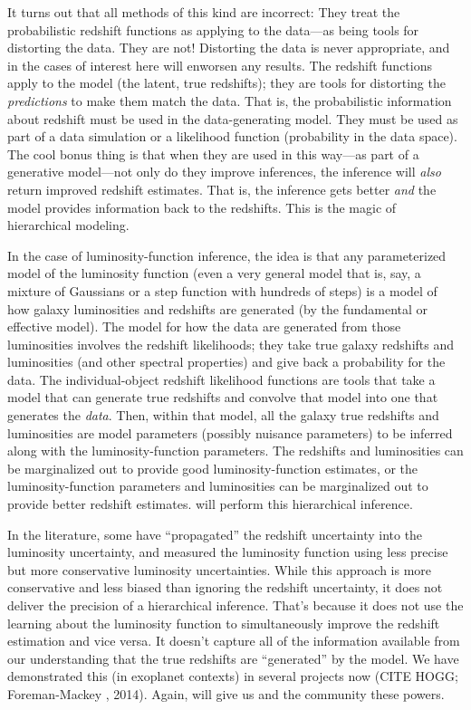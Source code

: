\documentclass[12pt]{article}
\begin{document}
It turns out that all methods of this kind are incorrect:
They treat the probabilistic redshift functions as applying to the
data---as being tools for distorting the data.
They are not!
Distorting the data is never appropriate, and in the cases of interest
here will enworsen any results.
The redshift functions apply to the model (the latent, true redshifts); they are tools
for distorting the \emph{predictions} to make them match the data.
That is, the probabilistic information about redshift must be used in
the data-generating model.
They must be used as part of a data simulation or a likelihood
function (probability in the data space).
The cool bonus thing is that when they are used in this way---as part
of a generative model---not only do they improve inferences, the
inference will \emph{also} return improved redshift estimates.  That
is, the inference gets better \emph{and} the model provides
information back to the redshifts.
This is the magic of hierarchical modeling.

In the case of luminosity-function inference,
the idea is that any parameterized model of the luminosity function
(even a very general model that is, say, a mixture of Gaussians or a
step function with hundreds of steps) is a model of how galaxy
luminosities and redshifts are generated (by the fundamental or
effective model).
The model for how the data are generated from those luminosities
involves the redshift likelihoods; they take true galaxy redshifts and
luminosities (and other spectral properties) and give back a
probability for the data.
The individual-object redshift likelihood functions are tools that
take a model that can generate true redshifts and convolve that model
into one that generates the \emph{data}.
Then, within that model, all the galaxy true redshifts and
luminosities are model parameters (possibly nuisance parameters) to be
inferred along with the luminosity-function parameters.
The redshifts and luminosities can be marginalized out to provide good
luminosity-function estimates,
or the luminosity-function parameters and luminosities can be marginalized
out to provide better redshift estimates.
 will perform this hierarchical inference.

In the literature, some have ``propagated'' the redshift uncertainty
into the luminosity uncertainty, and measured the luminosity function
using less precise but more conservative luminosity uncertainties.
While this approach is more conservative and less biased than ignoring
the redshift uncertainty, it does not deliver the precision of a
hierarchical inference.
That's because it does not use the learning about the luminosity
function to simultaneously improve the redshift estimation and vice
versa.
It doesn't capture all of the information available from our understanding
that the true redshifts are ``generated'' by the model.
We have demonstrated this (in exoplanet contexts) in several projects
now (CITE HOGG; Foreman-Mackey \etal, 2014).
Again,  will give us and the community these powers.
\end{document}
